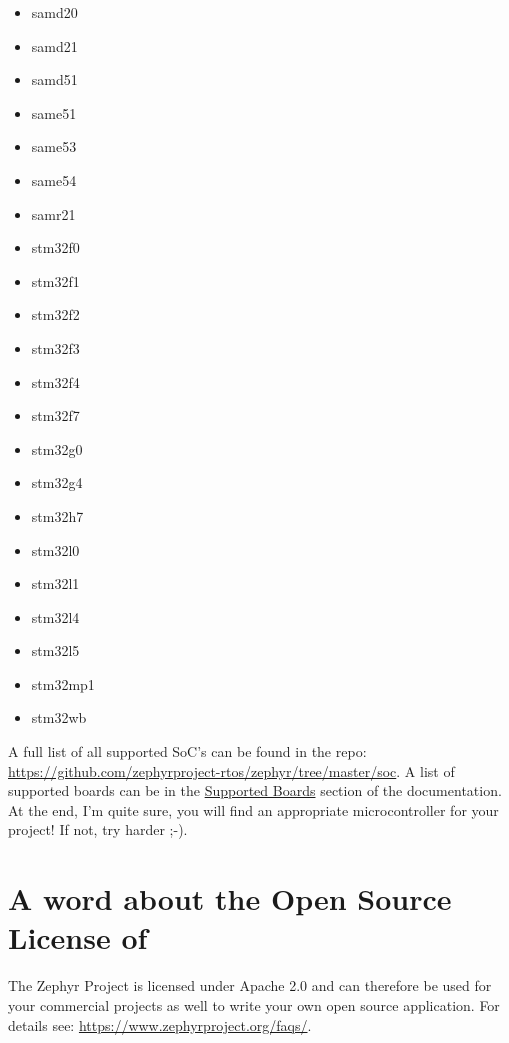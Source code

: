 \begin{multicols}{4}
\begin{itemize}
\item samd20
\item samd21
\item samd51
\item same51
\item same53
\item same54
\item samr21
\item stm32f0
\item stm32f1
\item stm32f2
\item stm32f3
\item stm32f4
\item stm32f7
\item stm32g0
\item stm32g4
\item stm32h7
\item stm32l0
\item stm32l1
\item stm32l4
\item stm32l5
\item stm32mp1
\item stm32wb
\end{itemize}
\end{multicols}

A full list of all supported SoC's can be found in the repo: \url{https://github.com/zephyrproject-rtos/zephyr/tree/master/soc}.
A list of supported boards can be in the \href{https://docs.zephyrproject.org/latest/boards/index.html}{Supported Boards} section of the \Zephyr documentation. At the end, I'm quite sure, you will find an appropriate microcontroller for your project! If not, try harder ;-).


\section{A word about the Open Source License of \Zephyr}

The Zephyr Project is licensed under Apache 2.0 and can therefore be used for your commercial projects as well to write your own open source application. For details see: \url{https://www.zephyrproject.org/faqs/}.
